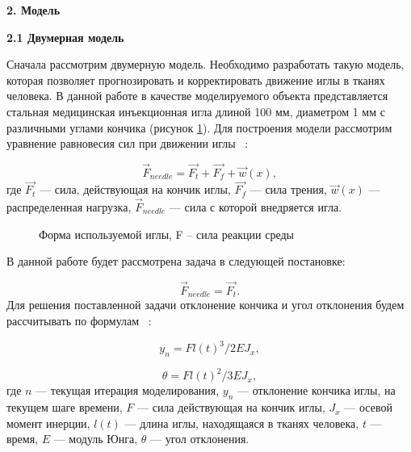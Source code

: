 \documentclass[10pt]{article}
\begin{document}
\bigskip
\textbf{2. Модель}

\bigskip
\textbf{2.1 Двумерная модель}

\bigskip
Сначала рассмотрим двумерную модель.
Необходимо разработать такую модель, которая позволяет прогнозировать и корректировать движение иглы в тканях человека.  В данной работе в качестве моделируемого объекта представляется стальная медицинская инъекционная игла длиной 100 мм, диаметром 1 мм с различными углами кончика (рисунок \ref{n1}).
Для построения модели рассмотрим  уравнение равновесия сил при движении иглы ~\cite{Model}: 

\begin{equation} \label{eq1}
\Vec{F}_{needle} = \Vec{F_{t}} + \Vec{F_{f}} + \Vec{w}(x),
\end{equation}
где $\Vec{F_{t}}$ --- сила, действующая на кончик иглы, $\Vec{F_{f}}$ --- сила трения, $\Vec{w}(x)$ --- распределенная нагрузка, $\Vec{F}_{needle}$ --- сила с которой внедряется игла.

\begin{figure}[h]
\caption{Форма используемой иглы, F – сила реакции среды}
\label{n1}
\end{figure}

В данной работе будет рассмотрена  задача в следующей постановке:

\begin{equation} \label{eq2}
\Vec{F}_{needle} = \Vec{F_{t}}.
\end{equation}
Для решения поставленной задачи отклонение кончика и угол отклонения будем рассчитывать по формулам ~\cite{Model}:

\begin{equation} \label{eq3}
y_{n} = Fl(t)^3 / 2EJ_{x},
\end{equation}

\begin{equation} \label{eq4}
\theta = Fl(t)^2 / 3EJ_{x},
\end{equation}
где $n$ --- текущая итерация моделирования, $y_{n}$ --- отклонение кончика иглы, на текущем шаге времени,
$F$ --- сила действующая на кончик иглы, $J_{x}$ --- осевой момент инерции, 
$l(t)$ --- длина иглы, находящаяся в тканях человека, $t$ --- время, $E$ --- модуль Юнга, $\theta$ --- угол отклонения.
\end{document}
